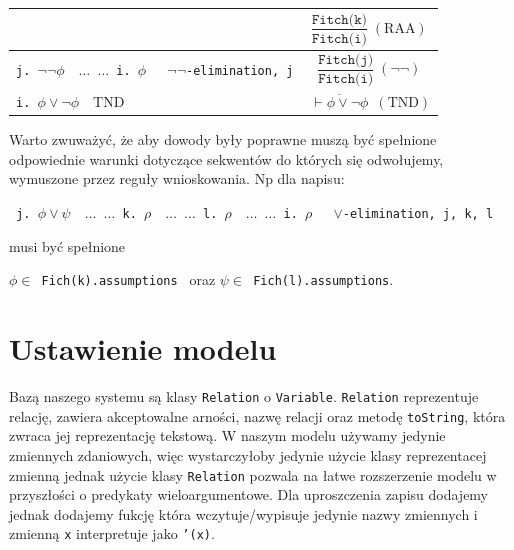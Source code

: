 \documentclass{article}
\begin{document}
\begin{center}
\begin{longtable}{|p{}|p{}|}
&

$$\displaystyle
\frac{\texttt{Fitch(k)}}{\texttt{Fitch(i)}}\;{(\mathrm{RAA})}
$$

\\
\hline



\texttt{j. $\neg \neg \phi \quad  \dots$
     \newline
     $\dots$
     \newline
     i. $\phi  \quad $ $\neg\neg$-elimination, j}

&

$$\displaystyle
\frac{\texttt{Fitch(j)}}{\texttt{Fitch(i)}}\;{(\neg\neg)}
$$

\\
\hline




\texttt{i. $\phi \lor \neg \phi \quad $}TND
&
$$\displaystyle
\overline{\ \vdash \phi \lor \neg \phi\ }\;{(\mathrm{TND})}$$
\\

\hline







\end{longtable}
\end{center}

Warto zwuważyć, że aby dowody były poprawne muszą być spełnione odpowiednie warunki dotyczące sekwentów do których się odwołujemy, wymuszone przez reguły wnioskowania. Np dla napisu:

\texttt{
     \newline
j. $  \phi \lor \psi  \quad  \dots$
\newline
$\dots$
\newline
k.  $\rho  \quad  \dots$
\newline
$\dots$
\newline
l. $\rho  \quad  \dots$
\newline
$\dots$
\newline     i. $\rho \quad$ $\lor$-elimination, j, k, l
\newline}


musi być spełnione

\texttt{$\phi \in$ Fich(k).assumptions \quad} oraz \quad \texttt{$\psi \in$ Fich(l).assumptions}.


\section{Ustawienie modelu}
Bazą naszego systemu są klasy \texttt{Relation} o \texttt{Variable}. \texttt{Relation} reprezentuje relację, zawiera
akceptowalne arności, nazwę relacji oraz metodę \texttt{toString}, która zwraca jej reprezentację tekstową. W naszym 
modelu używamy jedynie zmiennych zdaniowych, więc wystarczyłoby jedynie użycie klasy reprezentacej zmienną
jednak użycie klasy \texttt{Relation} pozwala na łatwe rozszerzenie modelu w przyszłości o predykaty wieloargumentowe.
Dla uproszczenia zapisu dodajemy jednak dodajemy fukcję która wczytuje/wypisuje jedynie nazwy zmiennych i zmienną \texttt{x} interpretuje jako \texttt{'(x)}.
\end{document}
